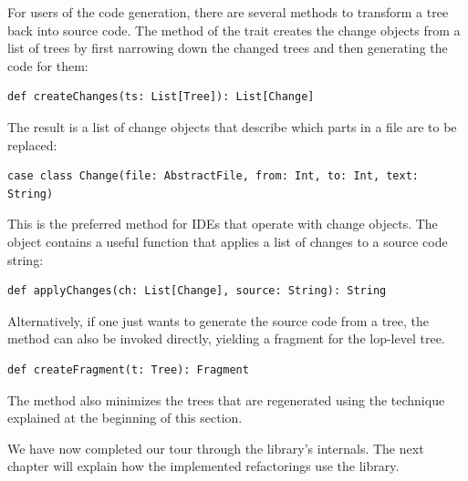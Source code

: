 For users of the code generation, there are several methods to transform a tree back into source code. The  method of the  trait creates the change objects from a list of trees by first narrowing down the changed trees and then generating the code for them:

\begin{lstlisting}
def createChanges(ts: List[Tree]): List[Change]
\end{lstlisting}

The result is a list of change objects that describe which parts in a file are to be replaced:

\begin{lstlisting}
case class Change(file: AbstractFile, from: Int, to: Int, text: String)
\end{lstlisting}

This is the preferred method for IDEs that operate with change objects. The  object contains a useful function that applies a list of changes to a source code string:

\begin{lstlisting}
def applyChanges(ch: List[Change], source: String): String
\end{lstlisting}

Alternatively, if one just wants to generate the source code from a tree, the  method can also be invoked directly, yielding a fragment for the lop-level tree. 

\begin{lstlisting}
def createFragment(t: Tree): Fragment
\end{lstlisting}

The  method also minimizes the trees that are regenerated using the technique explained at the beginning of this section.

We have now completed our tour through the library's internals. The next chapter will explain how the implemented refactorings use the library.

